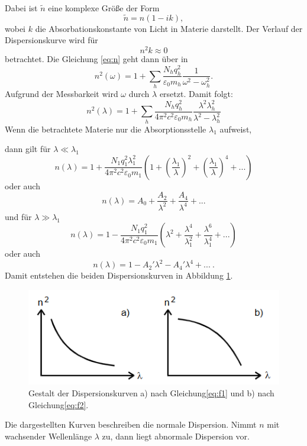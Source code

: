 Dabei ist $\tilde{n}$ eine komplexe Größe der Form
\begin{equation}
  \tilde{n} = n(1 - ik) ,
\end{equation}
wobei $k$ die Absorbationskonstante von Licht in Materie darstellt.
Der Verlauf der Dispersionskurve wird für
\begin{equation}
  n^2 k \approx 0
\end{equation}
betrachtet.
Die Gleichung \eqref{eq:n} geht dann über in
\begin{equation}
  n^2 (\omega) = 1 + \sum_{h} \frac{N_h q_h ^2}{\varepsilon_0 m_h}\frac {1}{\omega ^2 -\omega_h ^2} .
\end{equation}
Aufgrund der Messbarkeit wird $\omega$ durch $\lambda$ ersetzt.
Damit folgt:
\begin{equation}
  n^2 (\lambda) = 1 + \sum_{h} \frac{N_h q_h ^2}{4 \pi^2 c^2 \varepsilon_0 m_h}\frac{\lambda^2\lambda_h ^2}{\lambda^2 - \lambda_h ^2}
\end{equation}
Wenn die betrachtete Materie nur die Absorptionsstelle $\lambda_1$ aufweist,

\noindent dann gilt für $\lambda \ll \lambda_1$
\begin{equation}
  n(\lambda) = 1 + \frac{N_1 q_1 ^2 \lambda_1 ^2}{4 \pi^2 c^2 \varepsilon_0 m_1}\left(1 + \left(\frac{\lambda_1}{\lambda}\right)^2 + \left(\frac{\lambda_1}{\lambda}\right)^4 + ...\right)
\end{equation}
oder auch
\begin{equation}
  \label{eq:f1}
  n(\lambda) = A_0 + \frac{A_2}{\lambda^2} + \frac{A_4}{\lambda^4} + ...
\end{equation}
und für $\lambda \gg \lambda_1$
\begin{equation}
  \label{eq:b}
  n(\lambda) = 1 - \frac{N_1 q_1 ^2 }{4 \pi^2 c^2 \varepsilon_0 m_1}\left(\lambda^2+ \frac{\lambda^4}{\lambda_1 ^2} + \frac{\lambda^6}{\lambda_1 ^4} + ...\right) 
\end{equation}
oder auch
\begin{equation}
  \label{eq:f2}
  n(\lambda) = 1 - {A_2}'\lambda^2 - {A_4}'\lambda^4 + ... \: .
\end{equation}
Damit entstehen die beiden Dispersionskurven in Abbildung \ref{fig:disp}.
\begin{figure}[H]
  \centering
  \includegraphics[scale=0.6]{content/disp.png}
  \caption{Gestalt der Dispersionskurven a) nach Gleichung\eqref{eq:f1} und b) nach Gleichung\eqref{eq:f2}\cite{v402}.}
  \label{fig:disp}
\end{figure}
\noindent Die dargestellten Kurven beschreiben die normale Dispersion.
Nimmt $n$ mit wachsender Wellenlänge $\lambda$ zu, dann liegt abnormale Dispersion vor.
